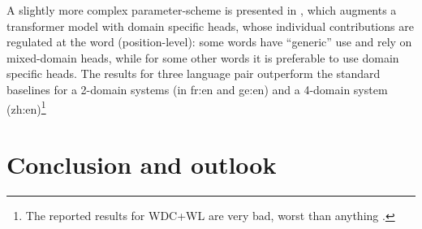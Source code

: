 \documentclass[11pt]{article}
\newcommand{\fyTodo}[1]{\Todo[FY:]{\textcolor{orange}{#1}}}
\begin{document}
A slightly more complex parameter-scheme is presented in \cite{Jiang19multidomain}, which augments a transformer model with domain specific heads, whose individual contributions are regulated at the word (position-level): some words have ``generic'' use and rely on mixed-domain heads, while for some other words it is preferable to use domain specific heads. The results for three language pair outperform the standard baselines for a 2-domain systems (in fr:en and ge:en) and a 4-domain system (zh:en)\footnote{The reported results for WDC+WL are very bad, worst than anything \fyTodo{This is a mystery to me}.}   

\section{Conclusion and outlook \label{sec:conclusion}}





\end{document}
